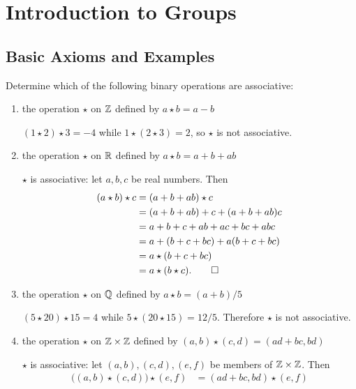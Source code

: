 \chapter{Introduction to Groups}

\section{Basic Axioms and Examples}

 Determine which of the following binary operations are
associative:
\begin{enumerate}
\item the operation $\star$ on $\mathbb{Z}$ defined by $a\star b = a - b$
  \begin{solution}
    $(1\star2)\star3 = -4$ while $1\star(2\star3) = 2$, so $\star$ is
    not associative.
  \end{solution}
\item the operation $\star$ on $\mathbb{R}$ defined by $a\star b = a + b + ab$
  \begin{solution}
    $\star$ is associative: let $a,b,c$ be real numbers. Then
    \begin{align*}
      (a\star b)\star c &= (a + b + ab)\star c \\
                        &= (a + b + ab) + c + (a + b + ab)c \\
                        &= a + b + c + ab + ac + bc + abc \\
                        &= a + (b + c + bc) + a(b + c + bc) \\
                        &= a\star(b + c + bc) \\
                        &= a\star(b\star c). \qedhere
    \end{align*}
  \end{solution}
\item the operation $\star$ on $\mathbb{Q}$ defined by $a\star b = (a + b)/5$
  \begin{solution}
    $(5\star20)\star15 = 4$ while $5\star(20\star15) =
    12/5$. Therefore $\star$ is not associative.
  \end{solution}
\item the operation $\star$ on $\mathbb{Z}\times\mathbb{Z}$ defined by
  $(a,b)\star(c,d) = (ad + bc, bd)$
  \begin{solution}
    $\star$ is associative: let $(a,b), (c,d), (e,f)$ be members of
    $\mathbb{Z}\times\mathbb{Z}$. Then
    \begin{align*}
      \big((a,b)\star(c,d)\big)\star(e,f)
      &= (ad + bc, bd)\star(e,f) \\

\end{align*}
\end{solution}
\end{enumerate}
